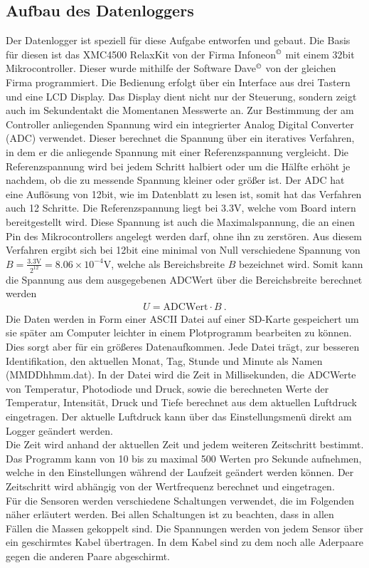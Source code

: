 \documentclass[12pt,a4paper,titlepage,headinclude,bibtotoc]{scrartcl}
\numberwithin{equation}{subsection}
\begin{document}
\subsection{Aufbau des Datenloggers}
Der Datenlogger ist speziell für diese Aufgabe entworfen und gebaut.
Die Basis für diesen ist das XMC4500 RelaxKit von der Firma Infoneon$^\copyright$ mit einem 32bit Mikrocontroller.
Dieser wurde mithilfe der Software Dave$^\copyright$ von der gleichen Firma programmiert.
Die Bedienung erfolgt über ein Interface aus drei Tastern und eine LCD Display.
Das Display dient nicht nur der Steuerung, sondern zeigt auch im Sekundentakt die Momentanen Messwerte an.
Zur Bestimmung der am Controller anliegenden Spannung wird ein integrierter Analog Digital Converter (ADC) verwendet.
Dieser berechnet die Spannung über ein iteratives Verfahren, in dem er die anliegende Spannung mit einer Referenzspannung vergleicht.
Die Referenzspannung wird bei jedem Schritt halbiert oder um die Hälfte erhöht je nachdem, ob die zu messende Spannung kleiner oder größer ist.
Der ADC hat eine Auflösung von 12bit, wie im Datenblatt \cite[7]{XMCRelaxkit} zu lesen ist, somit hat das Verfahren auch 12 Schritte.
Die Referenzspannung liegt bei 3.3\si{\volt}, welche vom Board intern bereitgestellt wird.
Diese Spannung ist auch die Maximalspannung, die an einen Pin des Mikrocontrollers angelegt werden darf, ohne ihn zu zerstören.
Aus diesem Verfahren ergibt sich bei 12bit eine minimal von Null verschiedene Spannung von $B=\frac{3.3\si{\volt}}{2^{12}}=8.06\times10^{-4}\si{\volt}$, welche als Bereichsbreite $B$ bezeichnet wird.
Somit kann die Spannung aus dem ausgegebenen ADCWert über die Bereichsbreite berechnet werden
\begin{align}
	U=\text{ADCWert}\cdot B~.\label{eq:ADCwert}
\end{align}
Die Daten werden in Form einer ASCII Datei auf einer SD-Karte gespeichert um sie später am Computer leichter in einem Plotprogramm bearbeiten zu können.
Dies sorgt aber für ein größeres Datenaufkommen.
Jede Datei trägt, zur besseren Identifikation, den aktuellen Monat, Tag, Stunde und Minute als Namen (MMDDhhmm.dat).
In der Datei wird die Zeit in Millisekunden, die ADCWerte von Temperatur, Photodiode und Druck, sowie die berechneten Werte der Temperatur, Intensität, Druck und Tiefe berechnet aus dem aktuellen Luftdruck eingetragen.
Der aktuelle Luftdruck kann über das Einstellungsmenü direkt am Logger geändert werden.\\
Die Zeit wird anhand der aktuellen Zeit und jedem weiteren Zeitschritt bestimmt.
Das Programm kann von 10 bis zu maximal 500 Werten pro Sekunde aufnehmen, welche in den Einstellungen während der Laufzeit geändert werden können.
Der Zeitschritt wird abhängig von der Wertfrequenz berechnet und eingetragen.\\
Für die Sensoren werden verschiedene Schaltungen verwendet, die im Folgenden näher erläutert werden.
Bei allen Schaltungen ist zu beachten, dass in allen Fällen die Massen gekoppelt sind.
Die Spannungen werden von jedem Sensor über ein geschirmtes Kabel übertragen.
In dem Kabel sind zu dem noch alle Aderpaare gegen die anderen Paare abgeschirmt.
\end{document}
